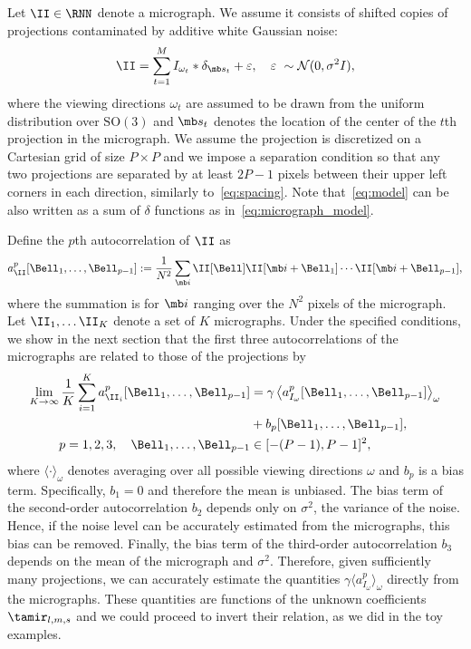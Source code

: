 \documentclass[9pt,twocolumn,twoside,lineno]{pnas-new}
\begin{document}
Let $\II\in\RNN$ denote a micrograph. We assume it consists of shifted copies of projections contaminated by additive white Gaussian noise:
\begin{equation}\label{eq:micrograph_model}
\II = \sum_{t=1}^{M} I_{\omega_t}\ast\delta_{\mb s_t}+ \varepsilon, \quad \varepsilon~\sim\mathcal{N}(0,\sigma^2 I),
\end{equation}
where the viewing directions $\omega_t$ are assumed to be drawn from the uniform distribution over $\text{SO}(3)$ and $\mb s_t$ denotes the location of the center of the $t$th projection in the micrograph.  
We assume the projection is discretized on a Cartesian grid  of size $P\times P$ and we impose a separation condition so that any two projections are separated by at least $2P-1$ pixels between their upper left corners  in each direction, similarly to~\eqref{eq:spacing}. Note that~\eqref{eq:model} can be also written as a sum of $\delta$ functions as in~\eqref{eq:micrograph_model}. 

Define the $p$th autocorrelation of $\II$ as
\begin{equation*} \label{eq:Kth_autocorrelation}
a^p_\II[\Bell_1,\ldots, \Bell_{p-1}] := \frac{1}{N^2}\sum_{\mb i}\II[\Bell]\II[\mb i+\Bell_1]\cdots \II[\mb i+\Bell_{p-1}],
\end{equation*}
where the summation is for $\mb i $ ranging over the $N^2$  pixels of the micrograph. 
Let $\II_1,\ldots\II_K$ denote a set of $K$ micrographs. 
Under the specified conditions, we show in the next section that the first three autocorrelations  of the micrographs are related to those of the projections by 
\begin{align} \label{eq:ac_micrographs}
\lim_{K\to\infty}\frac{1}{K}\sum_{i=1}^Ka^p_{\II_i}[\Bell_1,\ldots,\Bell_{p-1}]  &= \gamma\left\langle a^p_{I_\omega}[\Bell_1,\ldots,\Bell_{p-1}]\right\rangle_{\omega} \\&+ b_p[\Bell_1,\ldots,\Bell_{p-1}], \nonumber \\ p=1,2,3, \quad \Bell_1,\ldots,\Bell_{p-1}&\in[-(P-1),P-1]^2, \nonumber
\end{align}
where $\langle\cdot\rangle_\omega$ denotes averaging over all possible viewing directions $\omega$ and $b_p$ is a bias term. 
Specifically,  $b_1 = 0$ and therefore the mean is unbiased. The bias term of the second-order autocorrelation  $b_2$ depends only on $\sigma^2$, the variance of the noise. Hence, if the noise level can be accurately estimated from the micrographs, this bias can be removed. 
Finally, the bias term of the third-order autocorrelation $b_3$ depends on the mean of the micrograph and $\sigma^2$.  Therefore, given sufficiently many projections, we can accurately estimate the quantities $\gamma\langle a^p_{I_{\omega}}\rangle_{\omega}$ directly from the micrographs. These quantities are functions of the unknown coefficients $\tamir_{l,m,s}$ and we could proceed to invert their relation, as we did in the  toy examples. 
\end{document}
